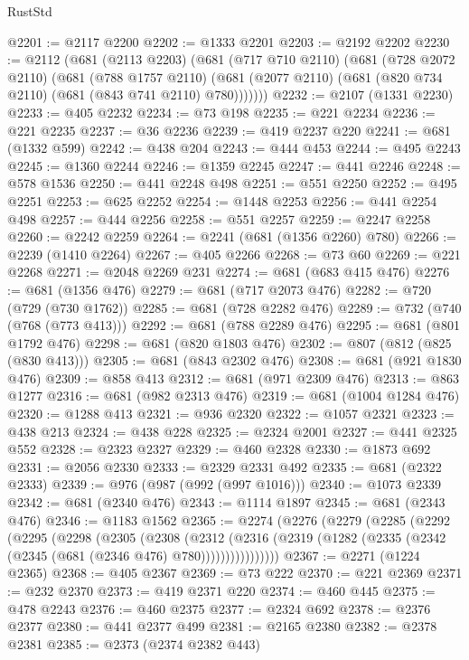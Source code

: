 \begin{lexlean}{RustStd}
\begin{coremodule}
{\begin{coremodule}
{{{{{{{{{{{{{{{{{{{{{{{{{@2201 := @2117 @2200
@2202 := @1333 @2201
@2203 := @2192 @2202
@2230 := @2112
    (@681
      (@2113 @2203)
      (@681
        (@717 @710 @2110)
        (@681
          (@728 @2072 @2110)
          (@681
            (@788 @1757 @2110)
            (@681 (@2077 @2110) (@681 (@820 @734 @2110) (@681 (@843 @741 @2110) @780)))))))
@2232 := @2107 (@1331 @2230)
@2233 := @405 @2232
@2234 := @73 @198
@2235 := @221 @2234
@2236 := @221 @2235
@2237 := @36 @2236
@2239 := @419 @2237 @220
@2241 := @681 (@1332 @599)
@2242 := @438 @204
@2243 := @444 @453
@2244 := @495 @2243
@2245 := @1360 @2244
@2246 := @1359 @2245
@2247 := @441 @2246
@2248 := @578 @1536
@2250 := @441 @2248 @498
@2251 := @551 @2250
@2252 := @495 @2251
@2253 := @625 @2252
@2254 := @1448 @2253
@2256 := @441 @2254 @498
@2257 := @444 @2256
@2258 := @551 @2257
@2259 := @2247 @2258
@2260 := @2242 @2259
@2264 := @2241 (@681 (@1356 @2260) @780)
@2266 := @2239 (@1410 @2264)
@2267 := @405 @2266
@2268 := @73 @60
@2269 := @221 @2268
@2271 := @2048 @2269 @231
@2274 := @681 (@683 @415 @476)
@2276 := @681 (@1356 @476)
@2279 := @681 (@717 @2073 @476)
@2282 := @720 (@729 (@730 @1762))
@2285 := @681 (@728 @2282 @476)
@2289 := @732 (@740 (@768 (@773 @413)))
@2292 := @681 (@788 @2289 @476)
@2295 := @681 (@801 @1792 @476)
@2298 := @681 (@820 @1803 @476)
@2302 := @807 (@812 (@825 (@830 @413)))
@2305 := @681 (@843 @2302 @476)
@2308 := @681 (@921 @1830 @476)
@2309 := @858 @413
@2312 := @681 (@971 @2309 @476)
@2313 := @863 @1277
@2316 := @681 (@982 @2313 @476)
@2319 := @681 (@1004 @1284 @476)
@2320 := @1288 @413
@2321 := @936 @2320
@2322 := @1057 @2321
@2323 := @438 @213
@2324 := @438 @228
@2325 := @2324 @2001
@2327 := @441 @2325 @552
@2328 := @2323 @2327
@2329 := @460 @2328
@2330 := @1873 @692
@2331 := @2056 @2330
@2333 := @2329 @2331 @492
@2335 := @681 (@2322 @2333)
@2339 := @976 (@987 (@992 (@997 @1016)))
@2340 := @1073 @2339
@2342 := @681 (@2340 @476)
@2343 := @1114 @1897
@2345 := @681 (@2343 @476)
@2346 := @1183 @1562
@2365 := @2274
    (@2276
      (@2279
        (@2285
          (@2292
            (@2295
              (@2298
                (@2305
                  (@2308
                    (@2312
                      (@2316
                        (@2319 (@1282 (@2335 (@2342 (@2345 (@681 (@2346 @476) @780))))))))))))))))
@2367 := @2271 (@1224 @2365)
@2368 := @405 @2367
@2369 := @73 @222
@2370 := @221 @2369
@2371 := @232 @2370
@2373 := @419 @2371 @220
@2374 := @460 @445
@2375 := @478 @2243
@2376 := @460 @2375
@2377 := @2324 @692
@2378 := @2376 @2377
@2380 := @441 @2377 @499
@2381 := @2165 @2380
@2382 := @2378 @2381
@2385 := @2373 (@2374 @2382 @443)
}}}}}}}}}}}}}}}}}}}}}}}}}
\end{coremodule}}
\end{coremodule}
\end{lexlean}
